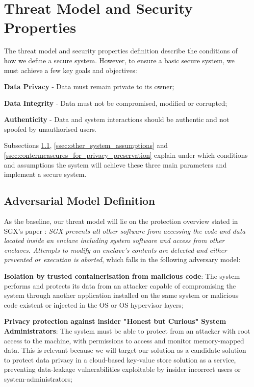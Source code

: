 \section{Threat Model and Security Properties}
\label{sec:threat_model_and_security_properties}

The threat model and security properties definition describe the conditions of how we define a secure system. However, to ensure a basic secure system, we must achieve a few key goals and objectives:
 
\textbf{Data Privacy} - Data must remain private to its owner;

\textbf{Data Integrity} - Data must not be compromised, modified or corrupted;

\textbf{Authenticity} - Data and system interactions should be authentic and not spoofed by unauthorised users.

Subsections \ref{ssec:adversarial_model_definition}, \ref{ssec:other_system_assumptions} and \ref{ssec:contermeaseures_for_privacy_preservation} explain under which conditions and assumptions the system will achieve these three main parameters and implement a secure system.

\subsection{Adversarial Model Definition}
\label{ssec:adversarial_model_definition}
	
As the baseline, our threat model will lie on the protection overview stated in SGX’s paper \cite{sgx:7}: \textit{SGX prevents all other software from accessing the code and data located inside an enclave including system software and access from other enclaves. Attempts to modify an enclave’s contents are detected and either prevented or execution is aborted}, which falls in the following adversary model:

\textbf{Isolation by trusted containerisation from malicious code}: The system performs and protects its data from an attacker capable of compromising the system through another application installed on the same system or malicious code existent or injected in the OS or OS hypervisor layers;

\textbf{Privacy protection against insider "Honest but Curious" System Administrators}: The system must be able to protect from an attacker with root access to the machine, with permissions to access and monitor memory-mapped data. This is relevant because we will target our solution as a candidate solution to protect data privacy in a cloud-based key-value store solution as a service, preventing data-leakage vulnerabilities exploitable by insider incorrect users or system-administrators;

